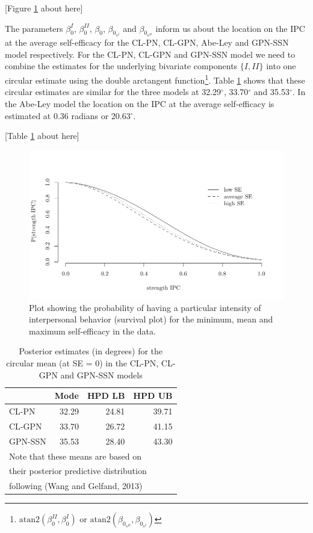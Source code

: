 \documentclass[man,mask]{apa6}
\let\rmarkdownfootnote\footnote%
\def\footnote{\protect\rmarkdownfootnote}
\begin{document}
\hfil [Figure \ref{reglineweib} about here] \hfil

\indent The parameters \(\beta_0^{I}\), \(\beta_0^{II}\), \(\beta_0\),
\(\beta_{0_{s^{I}}}\) and \(\beta_{0_{s^{II}}}\) inform us about the location on the IPC at the average self-efficacy for the CL-PN, CL-GPN,
Abe-Ley and GPN-SSN model respectively. For the CL-PN, CL-GPN and GPN-SSN model
we need to combine the estimates for the underlying bivariate components \(\{I, II\}\) into one circular estimate using the double arctangent
function\footnote{\(\mbox{atan2}(\beta_0^{II}, \beta_0^{I})\) or
\(\mbox{atan2}(\beta_{0_{s^{II}}}, \beta_{0_{s^{I}}})\)}.
Table \ref{tab:means} shows that these circular estimates are similar for the
three models at 32.29\(^\circ\), 33.70\(^\circ\) and 35.53\(^\circ\). In the Abe-Ley
model the location on the IPC at the average self-efficacy is
estimated at 0.36 radians or 20.63\(^\circ\).

\hfil [Table \ref{tab:means} about here] \hfil

\begin{figure}
\centering
\includegraphics[width = \textwidth]{Plots/survivaldiffSE.pdf}
\caption{Plot showing the probability of having a particular intensity of interpersonal behavior (survival plot) for the minimum, mean and maximum self-efficacy in the data.}
\label{reglineweib}
\end{figure}

\begin{table}
\caption{\label{tab:means}Posterior estimates (in degrees) for the circular mean (at SE = 0) in the CL-PN, CL-GPN and GPN-SSN models}
\centering
\begin{tabular}[t]{lrrr}
\toprule
  & Mode & HPD LB & HPD UB\\
  \midrule
CL-PN & 32.29 & 24.81 & 39.71\\
CL-GPN & 33.70 & 26.72 & 41.15\\
GPN-SSN & 35.53 & 28.40 & 43.30\\
\bottomrule
\multicolumn{4}{l}{Note that these means are based on}\\
\multicolumn{4}{l}{their posterior predictive distribution }\\
\multicolumn{4}{l}{following (Wang and Gelfand, 2013)}\\
\end{tabular}
\end{table}
\end{document}
